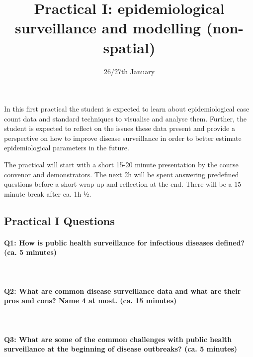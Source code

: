 \documentclass[
  11pt,
]{article}
\title{Practical I: epidemiological surveillance and modelling
(non-spatial)}
\author{}
\date{\vspace{-2.5em}26/27th January}
\begin{document}
\maketitle

In this first practical the student is expected to learn about
epidemiological case count data and standard techniques to visualise and
analyse them. Further, the student is expected to reflect on the issues
these data present and provide a perspective on how to improve disease
surveillance in order to better estimate epidemiological parameters in
the future.

The practical will start with a short 15-20 minute presentation by the
course convenor and demonstrators. The next 2h will be spent answering
predefined questions before a short wrap up and reflection at the end.
There will be a 15 minute break after ca. 1h ½.

\hypertarget{practical-i-questions}{%
\subsection{Practical I Questions}\label{practical-i-questions}}

\hypertarget{q1-how-is-public-health-surveillance-for-infectious-diseases-defined-ca.-5-minutes}{%
\paragraph{Q1: How is public health surveillance for infectious diseases
defined? (ca. 5
minutes)}\label{q1-how-is-public-health-surveillance-for-infectious-diseases-defined-ca.-5-minutes}}

~

\hypertarget{q2-what-are-common-disease-surveillance-data-and-what-are-their-pros-and-cons-name-4-at-most.-ca.-15-minutes}{%
\paragraph{Q2: What are common disease surveillance data and what are
their pros and cons? Name 4 at most. (ca. 15
minutes)}\label{q2-what-are-common-disease-surveillance-data-and-what-are-their-pros-and-cons-name-4-at-most.-ca.-15-minutes}}

~

\hypertarget{q3-what-are-some-of-the-common-challenges-with-public-health-surveillance-at-the-beginning-of-disease-outbreaks-ca.-5-minutes}{%
\paragraph{Q3: What are some of the common challenges with public health
surveillance at the beginning of disease outbreaks? (ca. 5
minutes)}\label{q3-what-are-some-of-the-common-challenges-with-public-health-surveillance-at-the-beginning-of-disease-outbreaks-ca.-5-minutes}}
\end{document}
